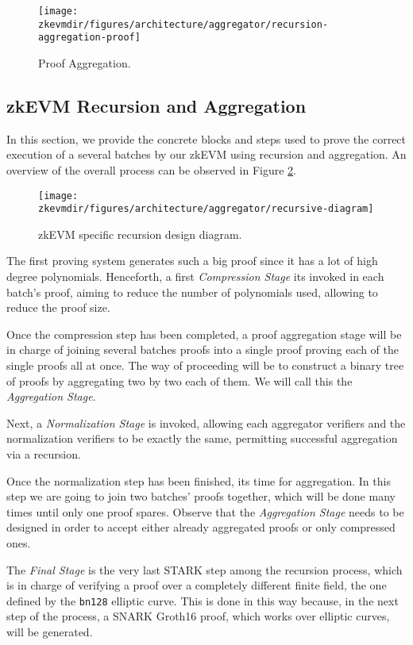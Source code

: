 \begin{figure}[H]
\centering
\texttt{[image: \\zkevmdir/figures/architecture/aggregator/recursion-aggregation-proof]}
\caption{Proof Aggregation.}
\label{fig:proof-aggregation}
\end{figure}




\subsection{zkEVM Recursion and Aggregation}

In this section, we provide the concrete blocks and steps used to
prove the correct execution of a several batches by our zkEVM using recursion and aggregation. An overview of the overall process can be observed in Figure \ref{fig:zkevm-recursion}.


\begin{figure}[H]
\centering
\texttt{[image: \\zkevmdir/figures/architecture/aggregator/recursive-diagram]}
\caption{zkEVM specific recursion design diagram.}
\label{fig:zkevm-recursion}
\end{figure}


The first proving system generates such a big proof since it has a lot of high degree polynomials. Henceforth, a first \textit{Compression Stage} its invoked in each batch's proof, aiming to reduce the number of polynomials used, allowing to reduce the proof size.

Once the compression step has been completed, a proof aggregation stage will be in charge of joining several batches proofs into a single proof proving each of the single proofs all at once. The way of proceeding will be to construct a binary tree of proofs by aggregating two by two each of them. We will call this the \textit{Aggregation Stage}.

Next, a \textit{Normalization Stage} is invoked, allowing each aggregator verifiers and the normalization verifiers to be exactly the same, permitting successful aggregation via a recursion.

Once the normalization step has been finished, its time for aggregation. In this step we are going to join two batches' proofs together, which will be done many times until only one proof spares. Observe that the \textit{Aggregation Stage} needs to be designed in order to accept either already aggregated proofs or only compressed ones.

The \textit{Final Stage} is the very last STARK step among the recursion process, which is in charge of verifying a proof over a completely different finite field, the one defined by the \texttt{bn128} elliptic curve. This is done in this way because, in the next step of the process, a SNARK Groth16 proof, which works over elliptic curves, will be generated.



